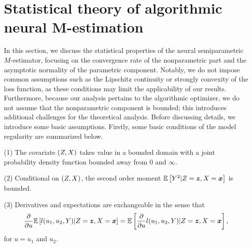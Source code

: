\section{Statistical theory of algorithmic neural M-estimation} \label{sec:str}
In this section, we discuss the statistical properties of the neural semiparametric $M$-estimator, focusing on the convergence rate of the nonparametric part and the asymptotic normality of the parametric component.
Notably, we do not impose common assumptions such as the Lipschitz continuity \citep[e.g.][]{ma2021statistical} or strongly convexity of the loss function, as these conditions may limit the applicability of our results.
Furthermore, because our analysis pertains to the algorithmic optimizer, we do not assume that the nonparametric component is bounded; this introduces additional challenges for the theoretical analysis.
Before discussing details, we introduce some basic assumptions.
Firstly, some basic conditions of the model regularity are summarized below.
\begin{assumption}
(1) The covariate $(Z, X)$ takes value in a bounded domain with a joint probability density function bounded away from $0$ and $\infty$. 

(2) Conditional on $(Z, X)$, the second order moment $\mathbb{E}\left[ 
Y^2|Z=\boldsymbol{z}, X=\boldsymbol{x} \right]$ is bounded. 

(3) Derivatives and expectations are exchangeable in the sense that
$$
\frac{\partial}{\partial u }
\mathbb{E}\left[ l(u_1, u_2,Y)|Z=\boldsymbol{z}, X=\boldsymbol{x} \right] = \mathbb{E}\left[ \frac{\partial}{\partial u } l(u_1, u_2,Y)|Z=\boldsymbol{z}, X=\boldsymbol{x} \right],
$$
for $u=u_1$ and $u_2$. 
\end{assumption}




